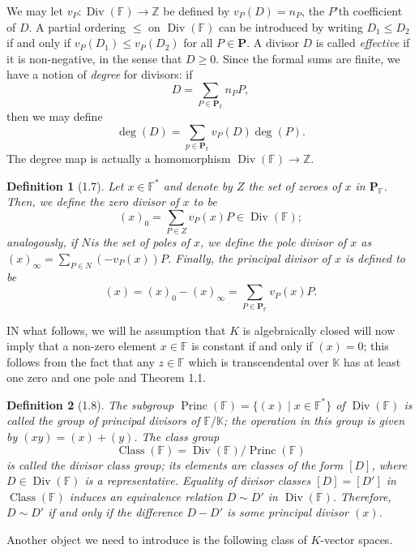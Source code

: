 \documentclass[11pt]{article}
\theoremstyle{scplain}
\newtheorem*{definition}{Definition}
\DeclareMathOperator{\Div}{Div}
\DeclareMathOperator{\Princ}{Princ}
\DeclareMathOperator{\Class}{Class}
\begin{document}
\noindent
We may let $v_P : \Div(\mathbb{F}) \longrightarrow \mathbb{Z}$ be defined by
$v_P(D) = n_P$, the $P$'th coefficient of $D$. A partial ordering $\leq$ on
$\Div(\mathbb{F})$ can be introduced by writing $D_1 \leq D_2$ if and only if
$v_P(D_1) \leq v_P(D_2)$ for all $P \in \mathbf{P}$. A divisor $D$ is called
\emph{effective} if it is non-negative, in the sense that $D \geq 0$. Since the
formal sums are finite, we have a notion of \emph{degree} for divisors: if
\[
  D = \sum_{P \in \mathbf{P}_{\mathbb{F}}} n_P P,
\]
then we may define
\[
  \deg(D) = \sum_{p \in \mathbf{P}_{\mathbb{F}}} v_P(D) \deg(P).
\]
The degree map is actually a homomorphism $\Div(\mathbb{F}) \longrightarrow \mathbb{Z}$.

\begin{definition}[1.7]
Let $x \in \mathbb{F}^*$ and denote by $Z$ the set of zeroes of $x$ in
$\mathbf{P}_{\mathbb{F}}$. Then, we define the zero divisor of $x$ to be
\[
  (x)_0 = \sum_{P \in Z} v_P(x) P \in \Div(\mathbb{F});
\]
analogously, if $N$is the set of poles of $x$, we define the pole divisor of $x$
as $(x)_\infty = \sum_{P \in N}(-v_P(x))P$. Finally, the principal divisor of $x$
is defined to be
\[
  (x) = (x)_0 - (x)_\infty = \sum_{P \in \mathbf{P}_{\mathbb{F}}} v_P(x) P.
\]
\end{definition}

IN what follows, we will he assumption that $K$ is algebraically closed will now
imply that a non-zero element $x \in \mathbb{F}$ is constant if and only if
$(x) = 0$; this follows from the fact that any $z \in \mathbb{F}$ which is
transcendental over $\mathbb{K}$ has at least one zero and one pole and
Theorem 1.1.

\begin{definition}[1.8]
The subgroup $\Princ(\mathbb{F}) = \{(x) \mid x \in \mathbb{F}^*\}$ of
$\Div(\mathbb{F})$ is called the group of principal divisors of
$\mathbb{F}/\mathbb{K}$; the operation in this group is given by
$(xy) = (x) + (y)$. The class group
\[
  \Class(\mathbb{F}) = \Div(\mathbb{F})/\Princ(\mathbb{F})
\]
is called the divisor class group; its elements are classes of the form $[D]$,
where $D \in \Div(\mathbb{F})$ is a representative. Equality of divisor classes
$[D] = [D']$ in $\Class(\mathbb{F})$ induces an equivalence relation $D \sim D'$ in
$\Div(\mathbb{F})$. Therefore, $D \sim D'$ if and only if the difference $D - D'$
is some principal divisor $(x)$.
\end{definition}

Another object we need to introduce is the following class of $K$-vector spaces.
\end{document}
